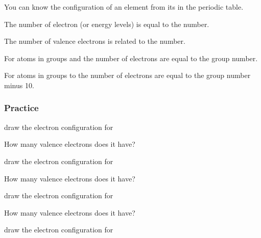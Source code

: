 \documentclass[12pt]{exam}
\begin{document}
\begin{questions}
\question You can know the \fillin[electron][3cm] configuration of an element from its \fillin[position][3cm] in the periodic table.

\question The number of electron \fillin[shells][2cm] (or energy levels) is equal to the \fillin[period][2cm] number.


\question The number of valence electrons is related to the \fillin[group][2cm] number.

\question For atoms in groups \fillin[one][2cm] and \fillin[two][2cm] the number of \fillin[valence][2cm] electrons are equal to the group number.

\question For atoms in groups \fillin[13][2cm] to \fillin[18][2cm] the number of \fillin[valence][2cm] electrons are equal to the group number minus 10.



\subsubsection{Practice}

\question draw the electron configuration for 


How many valence electrons does it have? \fillin[1][1cm]


\question draw the electron configuration for 


How many valence electrons does it have? \fillin[2][1cm]

\question draw the electron configuration for 



How many valence electrons does it have? \fillin[1][1cm]

\question draw the electron configuration for 



\end{questions}
\end{document}
